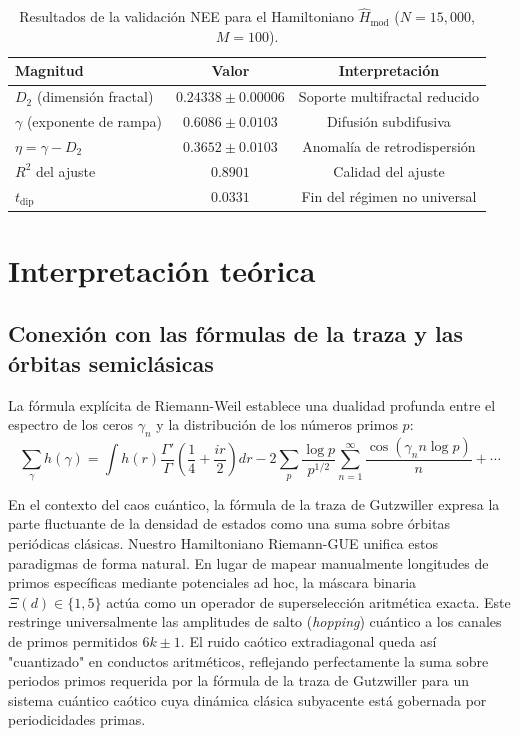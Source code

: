 \documentclass[aps,prl,preprint,superscriptaddress,floatfix]{revtex4-2}
\begin{document}
\begin{table}[h]
\caption{\label{tab:resultados_finales} Resultados de la validación NEE para el Hamiltoniano $\hat{H}_{\text{mod}}$ ($N=15,000$, $M=100$).}
\begin{ruledtabular}
\begin{tabular}{lcc}
\textbf{Magnitud} & \textbf{Valor} & \textbf{Interpretación} \\
\hline
$D_2$ (dimensión fractal) & $0.24338 \pm 0.00006$ & Soporte multifractal reducido \\
$\gamma$ (exponente de rampa) & $0.6086 \pm 0.0103$ & Difusión subdifusiva \\
$\eta = \gamma - D_2$ & $0.3652 \pm 0.0103$ & Anomalía de retrodispersión \\
$R^2$ del ajuste & $0.8901$ & Calidad del ajuste \\
$t_{\text{dip}}$ & $0.0331$ & Fin del régimen no universal \\
\end{tabular}
\end{ruledtabular}
\end{table}

\section{Interpretación teórica}

\subsection{Conexión con las fórmulas de la traza y las órbitas semiclásicas}

La fórmula explícita de Riemann-Weil establece una dualidad profunda entre el espectro de los ceros $\gamma_n$ y la distribución de los números primos $p$:
\begin{equation}
\sum_{\gamma} h(\gamma) = \int h(r) \frac{\Gamma'}{\Gamma}\left(\frac{1}{4} + \frac{ir}{2}\right) dr - 2\sum_{p} \frac{\log p}{p^{1/2}} \sum_{n=1}^\infty \frac{\cos(\gamma_n n\log p)}{n} + \cdots
\end{equation}

En el contexto del caos cuántico, la fórmula de la traza de Gutzwiller expresa la parte fluctuante de la densidad de estados como una suma sobre órbitas periódicas clásicas. Nuestro Hamiltoniano Riemann-GUE unifica estos paradigmas de forma natural. En lugar de mapear manualmente longitudes de primos específicas mediante potenciales ad hoc, la máscara binaria $\Xi(d) \in \{1,5\}$ actúa como un operador de superselección aritmética exacta. Este restringe universalmente las amplitudes de salto (\textit{hopping}) cuántico a los canales de primos permitidos $6k\pm1$. El ruido caótico extradiagonal queda así "cuantizado" en conductos aritméticos, reflejando perfectamente la suma sobre periodos primos requerida por la fórmula de la traza de Gutzwiller para un sistema cuántico caótico cuya dinámica clásica subyacente está gobernada por periodicidades primas.
\end{document}
